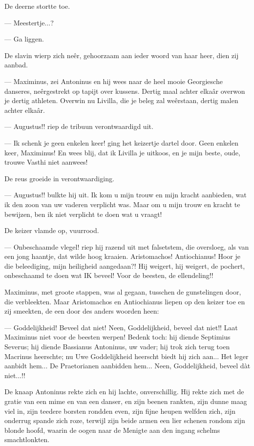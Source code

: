 \documentclass[a4paper, 12pt, oneside, dutch]{article}
\begin{document}
De deerne stortte toe.

--- Meestertje...?

--- Ga liggen.

De slavin wierp zich neêr, gehoorzaam aan ieder woord van haar heer, dien zij aanbad.

--- Maximinus, zei Antoninus en hij wees naar de heel mooie Georgiesche danseres, neêrgestrekt op tapijt over kussens. Dertig maal achter elkaâr overwon je dertig athleten. Overwin nu Livilla, die je beleg zal weêrstaan, dertig malen achter elkaâr.

--- Augustus!! riep de tribuun verontwaardigd uit.

--- Ik schenk je geen enkelen keer! ging het keizertje dartel door. Geen enkelen keer, Maximinus! En wees blij, dat ik Livilla je uitkoos, en je mijn beste, oude, trouwe Vasthi niet aanwees!

De reus groeide in verontwaardiging.

--- Augustus!! bulkte hij uit. Ik kom u mijn trouw en mijn kracht aanbieden, wat ik den zoon van uw vaderen verplicht was. Maar om u mijn trouw en kracht te bewijzen, ben ik niet verplicht te doen wat u vraagt!

De keizer vlamde op, vuurrood.

--- Onbeschaamde vlegel! riep hij razend uit met falsetstem, die oversloeg, als van een jong haantje, dat wilde hoog kraaien. Aristomachos! Antiochianus! Hoor je die beleediging, mijn heiligheid aangedaan?! Hij weigert, hij weigert, de pochert, onbeschaamd te doen wat IK beveel! Voor de beesten, de ellendeling!!

Maximinus, met groote stappen, was al gegaan, tusschen de gunstelingen door, die verbleekten. Maar Aristomachos en Antiochianus liepen op den keizer toe en zij smeekten, de een door des anders woorden heen:

--- Goddelijkheid! Beveel dat niet! Neen, Goddelijkheid, beveel dat niet!! Laat Maximinus niet voor de beesten werpen! Bedenk toch: hij diende Septimius Severus; hij diende Bassianus Antoninus, uw vader; hij trok zich terug toen Macrinus heerschte; nu Uwe Goddelijkheid heerscht biedt hij zich aan... Het leger aanbidt hem... De Praetorianen aanbidden hem... Neen, Goddelijkheid, beveel dàt niet...!!

De knaap Antoninus rekte zich en hij lachte, onverschillig. Hij rekte zich met de gratie van een mime en van een danser, en zijn beenen rankten, zijn dunne maag viel in, zijn teedere borsten rondden even, zijn fijne heupen welfden zich, zijn onderrug spande zich roze, terwijl zijn beide armen een lier schenen rondom zijn blonde hoofd, waarin de oogen naar de Menigte aan den ingang schelms smachtlonkten.
\end{document}
